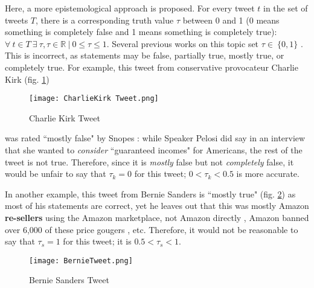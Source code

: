 \documentclass[preprint,review,12pt]{elsarticle}
\begin{document}
Here, a more epistemological approach is proposed. For every tweet $t$ in the set of tweets $T$, there is a corresponding truth value $\tau$ between 0 and 1 (0 means something is completely false and 1 means something is completely true): $\forall \ t \in T \ \exists \ \tau, \tau \in \mathbb{R} \ | \ 0 \leq \tau \leq 1$. Several previous works on this topic set $\tau \in \ \{0,1\}$ \cite{liu2018early,shu2017fake}. This is incorrect, as statements may be false, partially true, mostly true, or completely true. For example, this tweet from conservative provocateur Charlie Kirk (fig. \ref{fig:Charlie Kirk Tweet, May 4, 2020})  \begin{figure}[h]
    \centering
    \texttt{[image: CharlieKirk Tweet.png]}
    \caption{Charlie Kirk Tweet \cite{kirk2020tweet}}
    \label{fig:Charlie Kirk Tweet, May 4, 2020}
\end{figure} was rated ``mostly false" by Snopes \cite{lee2020pelosi}: while Speaker Pelosi did say in an interview that she wanted to \textit{consider} ``guaranteed incomes" for Americans, the rest of the tweet is not true. Therefore, since it is \textit{mostly} false but not \textit{completely} false, it would be unfair to say that $\tau_k = 0$ for this tweet; $ 0 < \tau_k < 0.5$ is more accurate. 


In another example, this tweet from Bernie Sanders is ``mostly true" (fig. \ref{fig:Bernie Sanders Tweet, Oct 13, 2020}) as most of his statements are correct, yet he leaves out that this was mostly Amazon \textbf{re-sellers} using the Amazon marketplace, not Amazon directly \cite{nicas2020sanitizer, kim2020price,gibson2020amazon}, Amazon banned over 6,000 of these price gougers \cite{bezos2020letter}, etc. Therefore, it would not be reasonable to say that $\tau_s = 1$ for this tweet; it is $ 0.5 < \tau_s < 1$. 
 \begin{figure}[h]
    \centering
    \texttt{[image: BernieTweet.png]}
    \caption{Bernie Sanders Tweet \cite{sanders2020tweet}}
    \label{fig:Bernie Sanders Tweet, Oct 13, 2020}
\end{figure}
\end{document}
